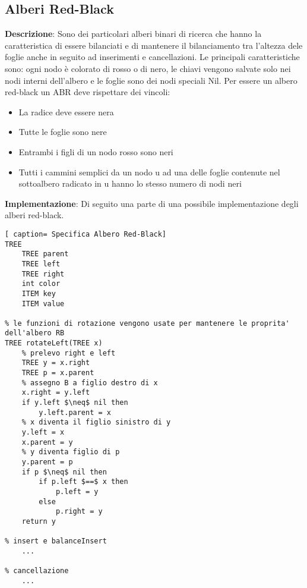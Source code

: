 \documentclass[../cheatSheetAlgoritmi.tex]{subfiles}
\begin{document}
\subsection{Alberi Red-Black}
\textbf{Descrizione}: Sono dei particolari alberi binari di ricerca che hanno la caratteristica di essere bilanciati e di mantenere il bilanciamento tra l'altezza dele foglie anche in seguito ad inserimenti e cancellazioni. Le principali caratteristiche sono: ogni nodo è colorato di rosso o di nero, le chiavi vengono salvate solo nei nodi interni dell'albero e le foglie sono dei nodi speciali Nil. Per essere un albero red-black un ABR deve rispettare dei vincoli:
\begin{itemize}
 	\item La radice deve essere nera
 	\item Tutte le foglie sono nere
 	\item Entrambi i figli di un nodo rosso sono neri
 	\item Tutti i cammini semplici da un nodo u ad una delle foglie contenute nel sottoalbero radicato in u hanno lo stesso numero di nodi neri
\end{itemize}
\textbf{Implementazione}: Di seguito una parte di una possibile implementazione degli alberi red-black.
\begin{lstlisting}[ caption= Specifica Albero Red-Black]
TREE
	TREE parent
	TREE left
	TREE right
	int color
	ITEM key
	ITEM value

% le funzioni di rotazione vengono usate per mantenere le proprita' dell'albero RB	
TREE rotateLeft(TREE x)
	% prelevo right e left
	TREE y = x.right
	TREE p = x.parent
	% assegno B a figlio destro di x
	x.right = y.left 
	if y.left $\neq$ nil then
		y.left.parent = x
	% x diventa il figlio sinistro di y
	y.left = x
	x.parent = y
	% y diventa figlio di p
	y.parent = p
	if p $\neq$ nil then
		if p.left $==$ x then
			p.left = y
		else
			p.right = y
	return y
  	
% insert e balanceInsert 
	...
	
% cancellazione
	...
\end{lstlisting}
\end{document}
